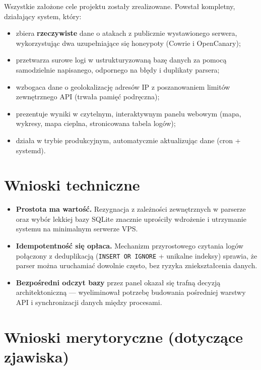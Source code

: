 \documentclass[12pt,a4paper]{report}
\begin{document}
Wszystkie założone cele projektu zostały zrealizowane. Powstał kompletny,
działający system, który:

\begin{itemize}
  \item zbiera \textbf{rzeczywiste} dane o atakach z publicznie wystawionego
        serwera, wykorzystując dwa uzupełniające się honeypoty (Cowrie
        i OpenCanary);
  \item przetwarza surowe logi w ustrukturyzowaną bazę danych za pomocą
        samodzielnie napisanego, odpornego na błędy i duplikaty parsera;
  \item wzbogaca dane o geolokalizację adresów IP z poszanowaniem limitów
        zewnętrznego API (trwała pamięć podręczna);
  \item prezentuje wyniki w czytelnym, interaktywnym panelu webowym
        (mapa, wykresy, mapa cieplna, stronicowana tabela logów);
  \item działa w trybie produkcyjnym, automatycznie aktualizując dane
        (cron + systemd).
\end{itemize}

\section{Wnioski techniczne}

\begin{itemize}
  \item \textbf{Prostota ma wartość.} Rezygnacja z zależności zewnętrznych
        w parserze oraz wybór lekkiej bazy SQLite znacznie uprościły wdrożenie
        i utrzymanie systemu na minimalnym serwerze VPS.
  \item \textbf{Idempotentność się opłaca.} Mechanizm przyrostowego czytania
        logów połączony z deduplikacją (\texttt{INSERT OR IGNORE} + unikalne
        indeksy) sprawia, że parser można uruchamiać dowolnie często, bez
        ryzyka zniekształcenia danych.
  \item \textbf{Bezpośredni odczyt bazy} przez panel okazał się trafną decyzją
        architektoniczną --- wyeliminował potrzebę budowania pośredniej warstwy
        API i synchronizacji danych między procesami.
\end{itemize}

\section{Wnioski merytoryczne (dotyczące zjawiska)}
\end{document}
